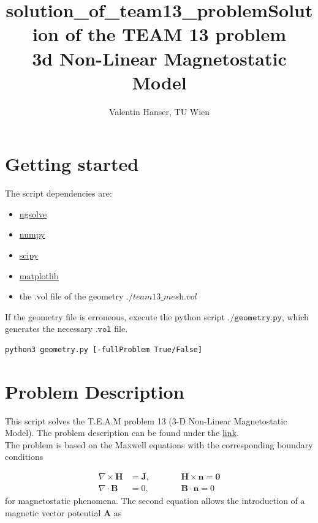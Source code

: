 \documentclass[11pt]{article}
\title{solution\_of\_team13\_problem}
\title{Solution of the TEAM 13 problem\\\small3d Non-Linear Magnetostatic Model}
\author{Valentin Hanser, TU Wien}
\begin{document}
    
    
    \maketitle
    
    

    
    \hypertarget{getting-started}{%
\section{Getting started}\label{getting-started}}

The script dependencies are: 
\begin{itemize}
	\item \href{https://ngsolve.org/downloads}{ngsolve} 
	\item \href{https://docs.scipy.org/doc/numpy/user/install.html}{numpy} 
	\item \href{https://scipy.org/install.html}{scipy} 
	\item \href{https://matplotlib.org/users/installing.html}{matplotlib} 
	\item the .vol file of the geometry \(\textit{./team13\_mesh.vol}\)
\end{itemize}

If the geometry file is erroneous, execute the python script
\(\texttt{./geometry.py}\), which generates the necessary
\(\texttt{.vol}\) file.

\begin{verbatim}
python3 geometry.py [-fullProblem True/False]
\end{verbatim}

    \hypertarget{problem-description}{%
\section{Problem Description}\label{problem-description}}

This script solves the T.E.A.M problem 13 (3-D Non-Linear Magnetostatic
Model). The problem description can be found under the
\href{https://www.compumag.org/wp/wp-content/uploads/2018/06/problem13.pdf}{link}.\\
The problem is based on the Maxwell equations with the corresponding
boundary conditions


\begin{align}
    \nabla \times \textbf{H} &= \textbf{J}, \qquad &&\textbf{H}\times\textbf{n} = \textbf{0}\\
    \nabla \cdot \textbf{B} &= 0,  &&\textbf{B}\cdot\textbf{n} = 0
\end{align}
for magnetostatic phenomena. The second equation allows the introduction
of a magnetic vector potential \(\textbf{A}\) as
\end{document}
